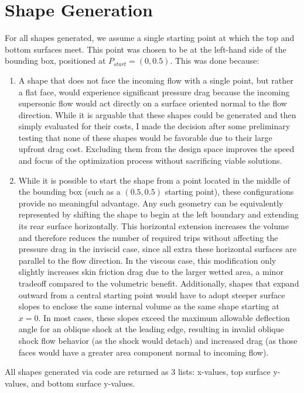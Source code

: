 \documentclass[11pt]{article}
\begin{document}
\section{Shape Generation}
For all shapes generated, we assume a single starting point at which the top and bottom surfaces meet. This point was chosen to be at the left-hand side of the bounding box, positioned at $P_{start}=(0,0.5)$. This was done because:
\begin{enumerate}
    \item A shape that does not face the incoming flow with a single point, but rather a flat face, would experience significant pressure drag because the incoming supersonic flow would act directly on a surface oriented normal to the flow direction. While it is arguable that these shapes could be generated and then simply evaluated for their costs, I made the decision after some preliminary testing that none of these shapes would be favorable due to their large upfront drag cost. Excluding them from the design space improves the speed and focus of the optimization process without sacrificing viable solutions.
    \item While it is possible to start the shape from a point located in the middle of the bounding box (such as a $(0.5,0.5)$ starting point), these configurations provide no meaningful advantage. Any such geometry can be equivalently represented by shifting the shape to begin at the left boundary and extending its rear surface horizontally. This horizontal extension increases the volume and therefore reduces the number of required trips without affecting the pressure drag in the inviscid case, since all extra these horizontal surfaces are parallel to the flow direction. In the viscous case, this modification only slightly increases skin friction drag due to the larger wetted area, a minor tradeoff compared to the volumetric benefit. Additionally, shapes that expand outward from a central starting point would have to adopt steeper surface slopes to enclose the same internal volume as the same shape starting at $x=0$. In most cases, these slopes exceed the maximum allowable deflection angle for an oblique shock at the leading edge, resulting in invalid oblique shock flow behavior (as the shock would detach) and increased drag (as those faces would have a greater area component normal to incoming flow).
\end{enumerate}
All shapes generated via code are returned as 3 lists: x-values, top surface y-values, and bottom surface y-values.
\end{document}
